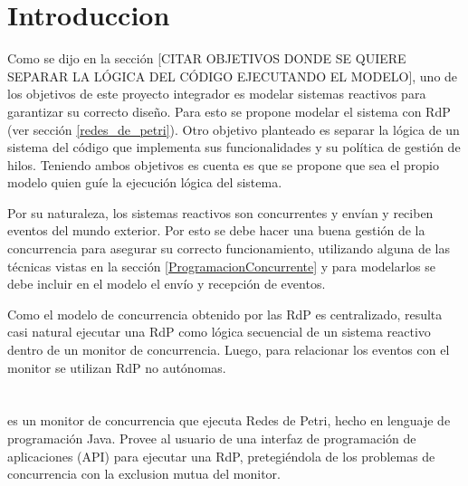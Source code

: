 \section{Introduccion}

Como se dijo en la sección [{\color{red}CITAR OBJETIVOS DONDE SE QUIERE
SEPARAR LA LÓGICA DEL CÓDIGO EJECUTANDO EL MODELO}], uno de los objetivos de
este proyecto integrador es modelar sistemas reactivos para garantizar su
correcto diseño.
Para esto se propone modelar el sistema con RdP (ver sección \ref{redes_de_petri}).
Otro objetivo planteado es separar la lógica de un sistema del código que
implementa sus funcionalidades y su política de gestión de hilos.
Teniendo ambos objetivos es cuenta es que se propone que sea el propio modelo
quien guíe la ejecución lógica del sistema.

Por su naturaleza, los sistemas reactivos son concurrentes y envían y reciben
eventos del mundo exterior.
Por esto se debe hacer una buena gestión de la concurrencia para asegurar su correcto
funcionamiento, utilizando alguna de las técnicas vistas en
la sección \ref{ProgramacionConcurrente} y para modelarlos se debe incluir en
el modelo el envío y recepción de eventos.

Como el modelo de concurrencia obtenido por las RdP es centralizado, resulta
casi natural ejecutar una RdP como lógica secuencial de un sistema reactivo
dentro de un monitor de concurrencia. Luego, para relacionar los eventos con el
monitor se utilizan RdP no autónomas.

\section{\javapetriconcurrencymonitor}

\javapetriconcurrencymonitor es un monitor de concurrencia que ejecuta Redes
de Petri, hecho en lenguaje de programación Java.
Provee al usuario de una interfaz de programación de aplicaciones (API) para
ejecutar una RdP, pretegiéndola de los problemas de concurrencia con la
exclusion mutua del monitor.

